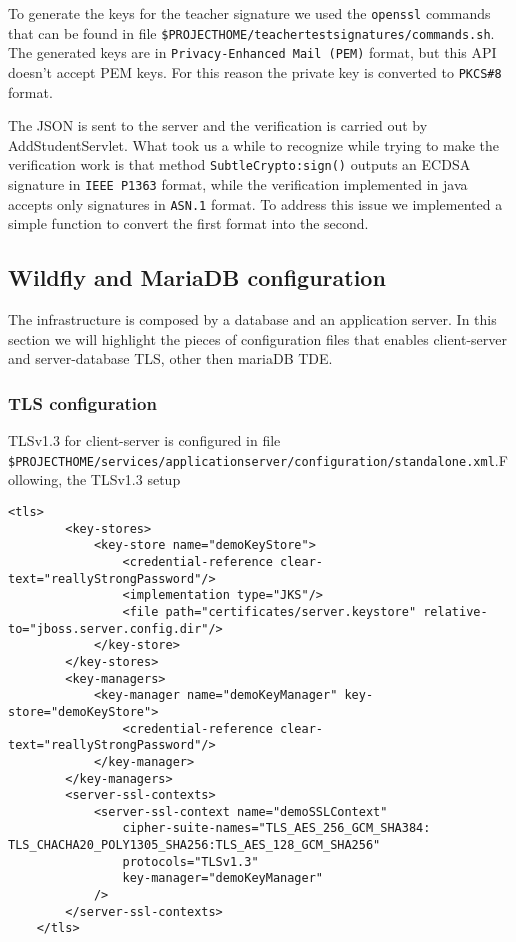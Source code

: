 To generate the keys for the teacher signature we used the \texttt{openssl} commands that can be found in file \texttt{\${PROJECT\textunderscore HOME}/teacher\textunderscore test\textunderscore signatures/commands.sh}. The generated keys are in \texttt{Privacy-Enhanced Mail (PEM)} format, but this API doesn't accept PEM keys. For this reason the private key is converted to \texttt{PKCS\#8} format.

The JSON is sent to the server and the verification is carried out by AddStudentServlet. What took us a while to recognize while trying to make the verification work is that method \texttt{SubtleCrypto:sign()} outputs an ECDSA signature in  \texttt{IEEE P1363} format, while the verification implemented in java accepts only signatures in \texttt{ASN.1} format. To address this issue we implemented a simple function to convert the first format into the second.

\subsection*{Wildfly and MariaDB configuration}

The infrastructure is composed by a database and an application server. In this section we will highlight the pieces of configuration files that enables client-server and server-database TLS, other then mariaDB TDE. 

\subsubsection{TLS configuration}
TLSv1.3 for client-server is configured in file \\\texttt{\$PROJECT\textunderscore HOME/services/application\textunderscore server/configuration/standalone.xml}.Following, the TLSv1.3 setup 

\begin{lstlisting}[style=XMLStyle, label=lst:xml-tls-client-server]
    <tls>
        <key-stores>
            <key-store name="demoKeyStore">
                <credential-reference clear-text="reallyStrongPassword"/>
                <implementation type="JKS"/>
                <file path="certificates/server.keystore" relative-to="jboss.server.config.dir"/>
            </key-store>
        </key-stores>
        <key-managers>
            <key-manager name="demoKeyManager" key-store="demoKeyStore">
                <credential-reference clear-text="reallyStrongPassword"/>
            </key-manager>
        </key-managers>
        <server-ssl-contexts>
            <server-ssl-context name="demoSSLContext" 
                cipher-suite-names="TLS_AES_256_GCM_SHA384:
TLS_CHACHA20_POLY1305_SHA256:TLS_AES_128_GCM_SHA256"
                protocols="TLSv1.3" 
                key-manager="demoKeyManager"
            />
        </server-ssl-contexts>
    </tls>
\end{lstlisting}

